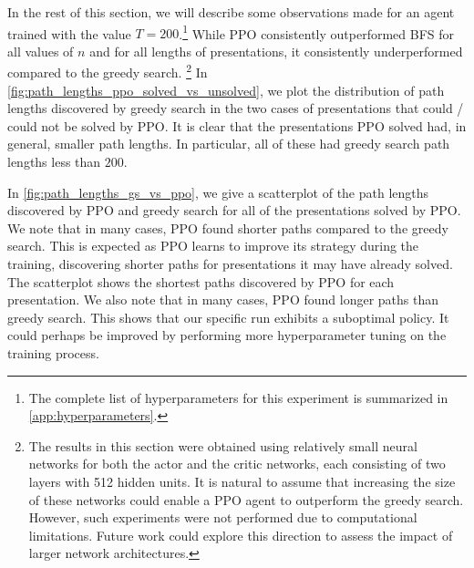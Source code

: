 In the rest of this section, we will describe some observations made for an agent trained with the value $T=200$.\footnote{The complete list of hyperparameters for this experiment is summarized in \autoref{app:hyperparameters}.}
While PPO consistently outperformed BFS for all values of $n$ and for all lengths of presentations, it consistently underperformed compared to the greedy search.
\footnote{The results in this section were obtained using relatively small neural networks for both the actor and the critic networks, each consisting of two layers with 512 hidden units. It is natural to assume that increasing the size of these networks could enable a PPO agent to outperform the greedy search. However, such experiments were not performed due to computational limitations. Future work could explore this direction to assess the impact of larger network architectures.}
In \autoref{fig:path_lengths_ppo_solved_vs_unsolved}, we plot the distribution of path lengths discovered by greedy search in the two cases of presentations that could / could not be solved by PPO. It is clear that the presentations PPO solved had, in general, smaller path lengths. In particular, all of these had greedy search path lengths less than $200$.

In \autoref{fig:path_lengths_gs_vs_ppo}, we give a scatterplot of the path lengths discovered by PPO and greedy search for all of the presentations solved by PPO. We note that in many cases, PPO found shorter paths compared to the greedy search. This is expected as PPO learns to improve its strategy during the training, discovering shorter paths for presentations it may have already solved. The scatterplot shows the shortest paths discovered by PPO for each presentation. We also note that in many cases, PPO found longer paths than greedy search. This shows that our specific run exhibits a suboptimal policy. It could perhaps be improved by performing more hyperparameter tuning on the training process.


